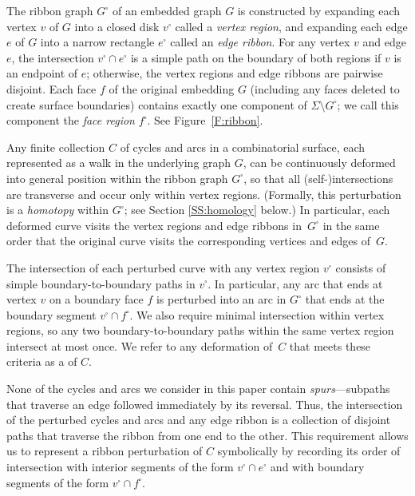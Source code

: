 \documentclass[letterpaper,review]{siamart190516}
\begin{document}
The ribbon graph $G^\square$ of an embedded graph $G$ is constructed by expanding each vertex $v$ of $G$ into a closed disk $v^\square$ called a \emph{vertex region}, and expanding each edge $e$ of $G$ into a narrow rectangle $e^\square$ called an \emph{edge ribbon}.  For any vertex $v$ and edge $e$, the intersection $v^\square\cap e^\square$ is a simple path on the boundary of both regions if $v$ is an endpoint of $e$; otherwise, the vertex regions and edge ribbons are pairwise disjoint.  Each face $f$ of the original embedding $G$ (including any faces deleted to create surface boundaries) contains exactly one component of $\Sigma\setminus G^\square$; we call this component the \emph{face region} $f^\square$.  See Figure~\ref{F:ribbon}.

Any finite collection $C$ of cycles and arcs in a combinatorial surface, each represented as a walk in the underlying graph $G$, can be continuously deformed into general position within the ribbon graph $G^\square$, so that all (self-)intersections are transverse and occur only within vertex regions.  (Formally, this perturbation is a \emph{homotopy} within $G^\square$; see Section \ref{SS:homology} below.)  In particular, each deformed curve visits the vertex regions and edge ribbons in~$G^\square$ in the same order that the original curve visits the corresponding vertices and edges of~$G$.

The intersection of each perturbed curve with any vertex region $v^\square$ consists of simple boundary-to-boundary paths in $v^\square$.  In particular, any arc that ends at vertex $v$ on a boundary face $f$ is perturbed into an arc in $G^\square$ that ends at the boundary segment $v^\square \cap f^\square$.  We also require minimal intersection within vertex regions, so any two boundary-to-boundary paths within the same vertex region intersect at most once.  We refer to any deformation of~$C$ that meets these criteria as a  of $C$.

None of the cycles and arcs we consider in this paper contain \emph{spurs}—subpaths that traverse an edge followed immediately by its reversal.  Thus, the intersection of the perturbed cycles and arcs and any edge ribbon is a collection of disjoint paths that traverse the ribbon from one end to the other.  This requirement allows us to represent a ribbon perturbation of $C$ symbolically by recording its order of intersection with interior segments of the form $v^\square\cap e^\square$ and with boundary segments of the form $v^\square\cap f^\square$.
\end{document}
